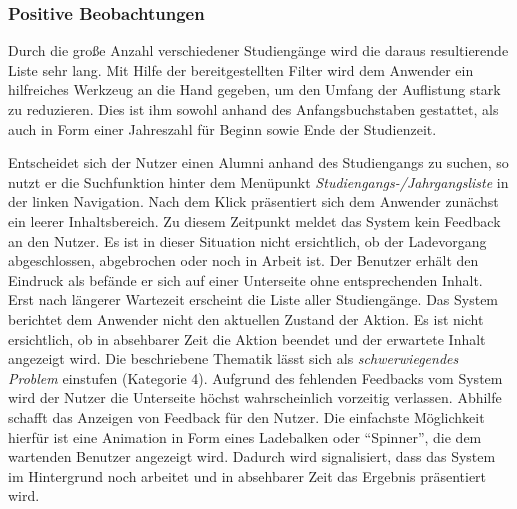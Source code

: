 
\subsubsection*{Positive Beobachtungen}
Durch die große Anzahl verschiedener Studiengänge wird die daraus resultierende Liste sehr lang. Mit Hilfe der bereitgestellten Filter wird dem Anwender ein hilfreiches Werkzeug an die Hand gegeben, um den Umfang der Auflistung stark zu reduzieren. Dies ist ihm sowohl anhand des Anfangsbuchstaben gestattet, als auch in Form einer Jahreszahl für Beginn sowie Ende der Studienzeit. 

{
	Entscheidet sich der Nutzer einen Alumni anhand des Studiengangs zu suchen, so nutzt er die Suchfunktion hinter dem Menüpunkt \emph{Studiengangs-/Jahrgangsliste} in der linken Navigation. Nach dem Klick präsentiert sich dem Anwender zunächst ein leerer Inhaltsbereich. Zu diesem Zeitpunkt meldet das System kein Feedback an den Nutzer. Es ist in dieser Situation nicht ersichtlich, ob der Ladevorgang abgeschlossen, abgebrochen oder noch in Arbeit ist. Der Benutzer erhält den Eindruck als befände er sich auf einer Unterseite ohne entsprechenden Inhalt. Erst nach längerer Wartezeit erscheint die Liste aller Studiengänge.
}
{
	Das System berichtet dem Anwender nicht den aktuellen Zustand der Aktion. Es ist nicht ersichtlich, ob in absehbarer Zeit die Aktion beendet und der erwartete Inhalt angezeigt wird. Die beschriebene Thematik lässt sich als \emph{schwerwiegendes Problem} einstufen (Kategorie 4). Aufgrund des fehlenden Feedbacks vom System wird der Nutzer die Unterseite höchst wahrscheinlich vorzeitig verlassen. 
}
{
	Abhilfe schafft das Anzeigen von Feedback für den Nutzer. Die einfachste Möglichkeit hierfür ist eine Animation in Form eines Ladebalken oder “Spinner”, die dem wartenden Benutzer angezeigt wird. Dadurch wird signalisiert, dass das System im Hintergrund noch arbeitet und in absehbarer Zeit das Ergebnis präsentiert wird.
}

